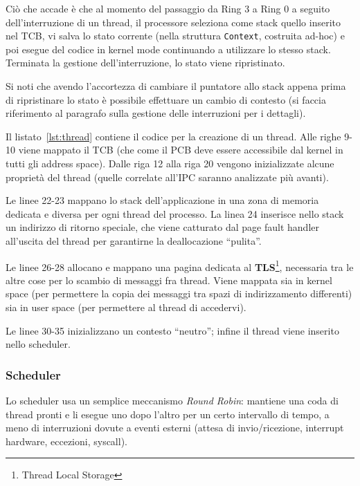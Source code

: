\documentclass[12pt,a4paper]{report}
\newcommand{\vir}[1]{``#1''}
\begin{document}
				Ciò che accade è che al momento del passaggio da Ring 3 a Ring 0 a seguito dell'interruzione di un
				thread, il processore seleziona come stack quello inserito nel TCB, vi salva lo stato corrente (nella
				struttura \texttt{Context}, costruita ad-hoc) e poi esegue del codice in kernel mode continuando a utilizzare
				lo stesso stack. Terminata la gestione dell'interruzione, lo stato viene ripristinato.
				
				Si noti che avendo l'accortezza di cambiare il puntatore allo stack appena prima di ripristinare lo stato
				è possibile effettuare un cambio di contesto (si faccia riferimento al paragrafo sulla gestione delle interruzioni
				per i dettagli).
								
				
				
				Il listato~\ref{lst:thread} contiene il codice per la creazione di un thread.
				Alle righe 9-10 viene mappato il TCB (che come il PCB deve essere accessibile dal kernel
				in tutti gli address space). Dalle riga 12 alla riga 20 vengono inizializzate alcune proprietà
				del thread (quelle correlate all'IPC saranno analizzate più avanti).
				
				Le linee 22-23 mappano lo stack dell'applicazione in una zona di memoria dedicata
				e diversa per ogni thread del processo.
				La linea 24 inserisce nello stack un indirizzo di ritorno speciale, che viene catturato
				dal page fault handler all'uscita del thread per garantirne la deallocazione \vir{pulita}.
				
				Le linee 26-28 allocano e mappano una pagina dedicata al \textbf{TLS}\footnote{Thread Local Storage},
				necessaria tra le altre cose per lo scambio di messaggi fra thread. Viene mappata sia in
				kernel space (per permettere la copia dei messaggi tra spazi di indirizzamento differenti)
				sia in user space (per permettere al thread di accedervi).
				
				Le linee 30-35 inizializzano un contesto \vir{neutro}; infine il thread viene inserito nello
				scheduler.
				
			\subsubsection{Scheduler}
				Lo scheduler usa un semplice meccanismo \emph{Round Robin}: mantiene una coda di thread
				pronti e li esegue uno dopo l'altro per un certo intervallo di tempo, a meno di interruzioni
				dovute a eventi esterni (attesa di invio/ricezione, interrupt hardware, eccezioni, syscall).
				
\end{document}
